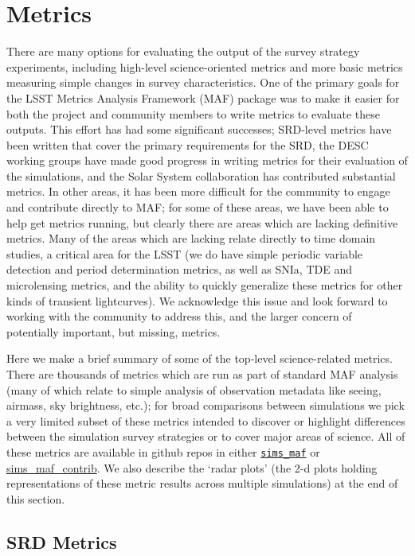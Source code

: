 \section{Metrics}

There are many options for evaluating the output of the survey strategy experiments, including high-level science-oriented metrics and more basic metrics measuring simple changes in survey characteristics. One of the primary goals for the LSST Metrics Analysis Framework (MAF) package was to make it easier for both the project and community members to write metrics to evaluate these outputs. This effort has had some significant successes; SRD-level metrics have been written that cover the primary requirements for the SRD, the DESC working groups have made good progress in writing metrics for their evaluation of the simulations, and the Solar System collaboration has contributed substantial metrics. In other areas, it has been more difficult for the community to engage and contribute directly to MAF; for some of these areas, we have been able to help get metrics running, but clearly there are areas which are lacking definitive metrics. Many of the areas which are lacking relate directly to time domain studies, a critical area for the LSST (we do have simple periodic variable detection and period determination metrics, as well as SNIa, TDE and microlensing metrics, and the ability to quickly generalize these metrics for other kinds of transient lightcurves). We acknowledge this issue and look forward to working with the community to address this, and the larger concern of potentially important, but missing, metrics. 

Here we make a brief summary of some of the top-level science-related metrics. There are thousands of metrics which are run as part of standard MAF analysis (many of which relate to simple analysis of observation metadata like seeing, airmass, sky brightness, etc.); for broad comparisons between simulations we pick a very limited subset of these metrics intended to discover or highlight differences between the simulation survey strategies or to cover major areas of science. All of these metrics are available in github repos in either \href{https://github.com/lsst/sims_maf/}{\tt sims\_maf} or \href{https://github.com/LSST-nonproject/sims_maf_contrib}{sims\_maf\_contrib}. We also describe the `radar plots' (the 2-d plots holding representations of these metric results across multiple simulations) at the end of this section. 

\subsection{SRD Metrics}

